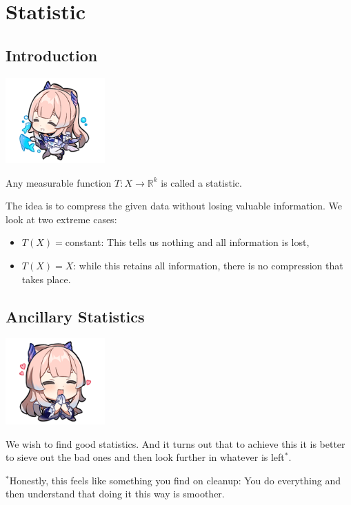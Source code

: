 \documentclass[oneside]{book}
\begin{document}
\chapter{Statistic}
\section{Introduction}\begin{marginfigure}%
    \includegraphics[width=1.5in]{chibis/file_007.png}
\end{marginfigure}%
Any measurable function $T:X\to \mathbb R^k$ is called a statistic. 

The idea is to compress the given data without losing valuable information. We look at two extreme cases:
\begin{itemize}
    \item $T(X)=$constant: This tells us nothing and all information is lost,
    \item $T(X)=X$: while this retains all information, there is no compression that takes place. 
\end{itemize}

\section{Ancillary Statistics}
\begin{marginfigure}%
    \includegraphics[width=1.5in]{chibis/file_008.png}
\end{marginfigure}%
We wish to find good statistics. And it turns out that to achieve this it is better to sieve out the bad ones and then look further in whatever is left$^*$.\\
\begin{marginfigure}%
    \footnotesize $^*$Honestly, this feels like something you find on cleanup: You do everything and then understand that doing it this way is smoother.
\end{marginfigure}%
\end{document}
